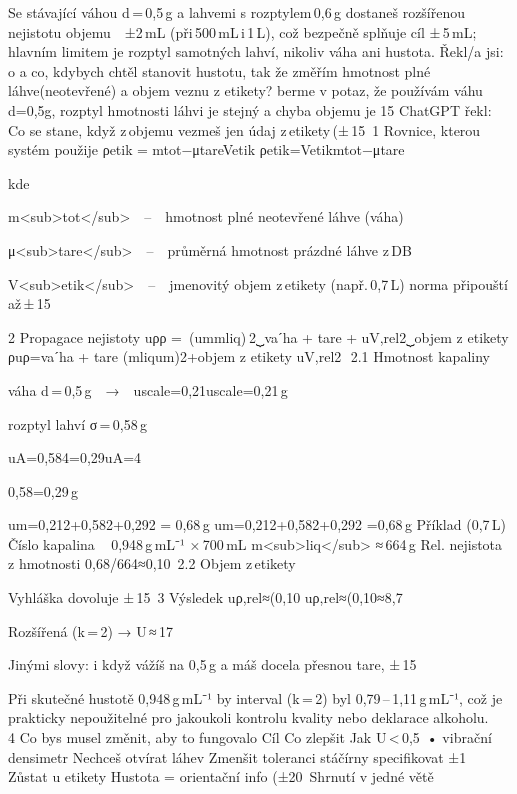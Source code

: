 {Se stávající váhou d = 0,5 g a lahvemi s rozptylem 0,6 g dostaneš rozšířenou nejistotu objemu ~ ±2 mL (při 500 mL i 1 L), což bezpečně splňuje cíl ± 5 mL; hlavním limitem je rozptyl samotných lahví, nikoliv váha ani hustota.
Řekl/a jsi:
o a co, kdybych chtěl stanovit hustotu,  tak že změřím hmotnost plné láhve(neotevřené) a objem veznu z etikety? berme v potaz, že používám váhu d=0,5g, rozptyl hmotnosti láhvi je stejný a chyba objemu je 15%
ChatGPT řekl:
Co se stane, když z objemu vezmeš jen údaj z etikety (± 15 %
1  Rovnice, kterou systém použije
ρetik  =  mtot−μtareVetik
ρetik​=Vetik​mtot​−μtare​​

kde

    m<sub>tot</sub> – hmotnost plné neotevřené láhve (váha)

    μ<sub>tare</sub> – průměrná hmotnost prázdné láhve z DB

    V<sub>etik</sub> – jmenovitý objem z etikety (např. 0,7 L)
    norma připouští až ± 15 %

2  Propagace nejistoty
uρρ  =   (ummliq) ⁣2⏟vaˊha + tare  +  uV,rel2⏟objem z etikety
ρuρ​​=vaˊha + tare
(mliq​um​​)2​​+objem z etikety
uV,rel2​​​
​
2.1  Hmotnost kapaliny

    váha d = 0,5 g → uscale=0,21uscale​=0,21 g

    rozptyl lahví σ = 0,58 g

    uA=0,584=0,29uA​=4

    ​0,58​=0,29 g

um=0,212+0,582+0,292  =  0,68 g
um​=0,212+0,582+0,292
​=0,68 g
Příklad (0,7 L)	Číslo
kapalina ~ 0,948 g mL⁻¹ × 700 mL	m<sub>liq</sub> ≈ 664 g
Rel. nejistota z hmotnosti	0,68/664≈0,10 %
2.2  Objem z etikety

Vyhláška dovoluje ± 15 %
3  Výsledek
uρ,rel≈(0,10%
uρ,rel​≈(0,10%
​≈8,7%

Rozšířená (k = 2) → U ≈ 17 %

    Jinými slovy: i když vážíš na 0,5 g a máš docela přesnou tare, ± 15 %

Při skutečné hustotě 0,948 g mL⁻¹ by interval (k = 2) byl 0,79 – 1,11 g mL⁻¹, což je prakticky nepoužitelné pro jakoukoli kontrolu kvality nebo deklarace alkoholu.
4  Co bys musel změnit, aby to fungovalo
Cíl	Co zlepšit	Jak
U < 0,5 %
• vibrační densimetr
Nechceš otvírat láhev	Zmenšit toleranci stáčírny	specifikovat ±1 %
Zůstat u etikety	Hustota = orientační info (±20 %
Shrnutí v jedné větě

}
